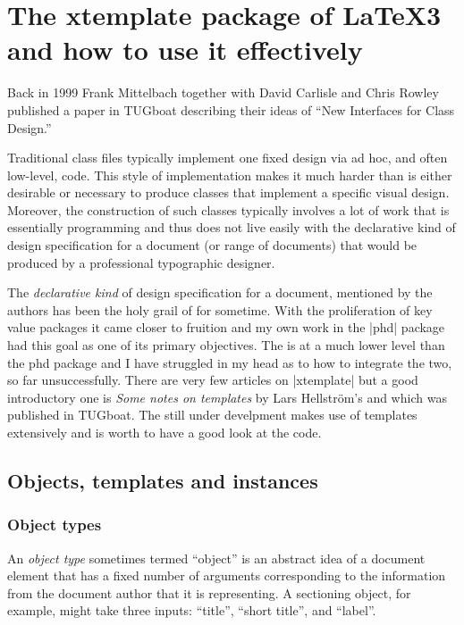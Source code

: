 
\chapter{The xtemplate package of LaTeX3 and how to use it effectively}

Back in 1999 Frank Mittelbach together with David Carlisle and Chris Rowley published a paper in TUGboat describing their ideas of  \enquote{New Interfaces for \latex Class Design.} 
 
 \begin{latexquote}
 Traditional \latex class files typically implement one
fixed design via ad hoc, and often low-level, \latex
code. This style of implementation makes it much
harder than is either desirable or necessary to produce
classes that implement a specific visual design.
Moreover, the construction of such classes typically
involves a lot of work that is essentially programming
and thus does not live easily with the declarative
kind of design specification for a document (or
range of documents) that would be produced by a
professional typographic designer.
\end{latexquote}

The \emph{declarative kind} of design specification for a document, mentioned by the authors has been the holy grail of \latex for sometime. With the proliferation of key value packages it came closer to fruition and my own work in the |phd| package had this goal as one of its primary objectives. The  is at a much lower level than the phd package and I have struggled in my head as to how to integrate the two, so far unsuccessfully. There are very few articles on |xtemplate| but a good introductory one is \emph{Some notes on templates} by  Lars Hellström’s and which was published in TUGboat. The  still under develpment makes use of templates extensively and is worth to have a good look at the code.

\section{Objects, templates and instances}

\subsection{Object types}

An \emph{object type} sometimes termed \enquote{object} is an abstract idea of a document element that has a fixed number of arguments corresponding to the information from the document author that it is representing.  A sectioning object, for example, might take three inputs: \enquote{title}, \enquote{short title}, and \enquote{label}.


